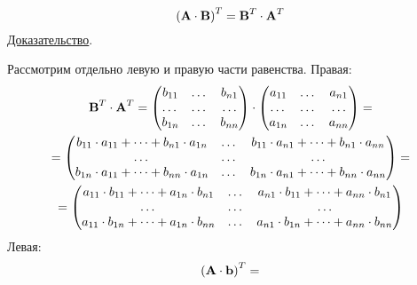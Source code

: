 \begin{theorem}
    \begin{equation*}
        \left( \bf{A} \cdot \bf{B} \right)^T = \bf{B}^T \cdot \bf{A}^T
    \end{equation*}
    \underline{Доказательство}.
    \vspace{5pt}

    Рассмотрим отдельно левую и правую части равенства. Правая:
    \begin{gather*}
        \bf{B}^T \cdot \bf{A}^T =
        \begin{pmatrix}
            b_{11} & \dots & b_{n1} \\
            \dots  & \dots & \dots  \\
            b_{1n} & \dots & b_{nn}
        \end{pmatrix}
        \cdot
        \begin{pmatrix}
            a_{11} & \dots & a_{n1} \\
            \dots  & \dots & \dots  \\
            a_{1n} & \dots & a_{nn}
        \end{pmatrix} =\\
        =\begin{pmatrix}
             b_{11} \cdot a_{11} + \dots + b_{n1} \cdot a_{1n} & \dots & b_{11} \cdot a_{n1} + \dots + b_{n1} \cdot a_{nn} \\
             \dots                                             & \dots & \dots                                             \\
             b_{1n} \cdot a_{11} + \dots + b_{nn} \cdot a_{1n} & \dots & b_{1n} \cdot a_{n1} + \dots + b_{nn} \cdot a_{nn}
        \end{pmatrix} = \\
        = \begin{pmatrix}
              a_{11} \cdot b_{11} + \dots + a_{1n} \cdot b_{n1} & \dots & a_{n1} \cdot b_{11} + \dots + a_{nn} \cdot b_{n1} \\
              \dots                                             & \dots & \dots                                             \\
              a_{11} \cdot b_{1n} + \dots + a_{1n} \cdot b_{nn} & \dots & a_{n1} \cdot b_{1n} + \dots + a_{nn} \cdot b_{nn}
        \end{pmatrix}
    \end{gather*}
    Левая:
    \begin{gather*}
        \left( \bf{A} \cdot \bf{b} \right)^T =

\end{gather*}
\end{theorem}
